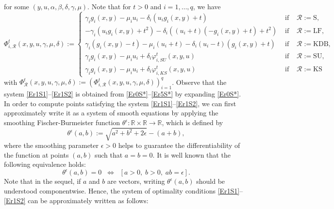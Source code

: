 for some  $(y,u, \alpha, \beta, \delta, \gamma, \mu)$. Note that for $t>0$ and  $i=1, \ldots, q$, we have 
\begin{equation*}
    \Phi^{t}_{i, \mathcal{R}}(x, y, u,\gamma,\mu,\delta):=\left\{ 
    \begin{array}{lll}
                 \gamma_{i} g_i(x,y)  -\mu_{i}u_i    - \delta_{i}(u_i g_i(x,y)+t)
        &  \mbox{ if } & \mathcal{R}:=\text{S},\\[1ex]
           -\gamma_{i}(u_{i}g_{i}(x,y)+t^{2}) -\delta_{i}((u_{i}+t)(-g_{i}(x,y)+t)+t^{2})
         &  \mbox{ if } & \mathcal{R}:=\text{LF},\\[2.5ex]
           \gamma_{i}( g_i(x,y) -t)  - \mu_{i}(u_i + t) - \delta_{i}(u_i -t)(g_i(x,y) + t)
         &  \mbox{ if } & \mathcal{R}:=\text{KDB},\\[2.5ex]
            \gamma_{i} g_i(x,y) -\mu_{i}u_i +   \delta_{i}\varphi^t_{i, SU}(x,y,u)
       &  \mbox{ if } & \mathcal{R}:= \text{SU},\\[2.5ex]
            \gamma_{i} g_i(x,y) -\mu_{i}u_i + \delta_{i} \varphi^t_{i, KS}(x,y,u)
        &  \mbox{ if } & \mathcal{R}:=\text{KS}
    \end{array} 
    \right.
\end{equation*}
with $\Phi^{t}_{\mathcal{R}}(x, y, u,\gamma,\mu,\delta):=\left(\Phi^{t}_{i, \mathcal{R}}(x, y, u,\gamma,\mu,\delta)\right)^q_{i=1}$.  
Observe that the system \eqref{Er1S1}--\eqref{Er1S2} is obtained from  \eqref{Er0S*}--\eqref{Er5S*} by expanding \eqref{Er0S*}. 
In order to compute points satisfying the system \eqref{Er1S1}--\eqref{Er1S2}, we can first approximately write it  as a system of   {smooth} equations by applying the  smoothing Fischer-Burmeister function $\theta^\epsilon :\mathbb{R}\times \mathbb{R} \rightarrow \mathbb{R}$, which is defined by 
\[
\theta^{\epsilon}(a, b):=\sqrt{a^2 + b^2 +   {2\epsilon}} -(a + b),
\]
where the smoothing parameter $\epsilon>0$ helps to guarantee the  differentiability of the function at points $(a, b)$ such that $a=b=0$. It is well known that the following equivalence holds:
\begin{equation}\label{perb}
    \theta^{\epsilon}(a, b) = 0 \;\;\Longleftrightarrow \;\; [a>0, \; b>0,\; ab = \epsilon ].
\end{equation}
Note that in the sequel, if $a$ and $b$ are vectors, writing $\theta^{\epsilon}(a, b)$ should be understood componentwise. Hence, the system of  optimality conditions \eqref{Er1S1}--\eqref{Er1S2} can be approximately written as follows: 
